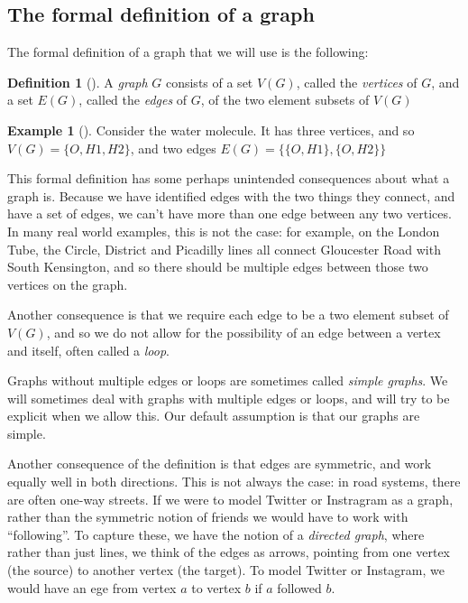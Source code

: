 \documentclass[10pt,]{book}
\theoremstyle{plain}
\theoremstyle{definition}
\newtheorem{definition}[theorem]{Definition}
\theoremstyle{definition}
\newtheorem{example}[theorem]{Example}
\theoremstyle{definition}
\begin{document}
\subsection[{The formal definition of a graph}]{The formal definition of a graph}\label{subsection-2}
\hypertarget{p-6}{}%
The formal definition of a graph that we will use is the following:%
\begin{definition}[{}]\label{definition-1}
\hypertarget{p-7}{}%
A \emph{graph} \(G\) consists of a set \(V(G)\), called the \emph{vertices} of \(G\), and a set \(E(G)\), called the \emph{edges} of \(G\), of the two element subsets of \(V(G)\)%
\end{definition}
\begin{example}[]\label{example-1}
\hypertarget{p-8}{}%
Consider the water molecule.  It has three vertices, and so \(V(G)=\{O, H1, H2\}\), and two edges \(E(G)=\big\{\{O, H1\},\{O,H2\}\big\}\)%
\end{example}
\hypertarget{p-9}{}%
This formal definition has some perhaps unintended consequences about what a graph is.  Because we have identified edges with the two things they connect, and have a set of edges, we can't have more than one edge between any two vertices.  In many real world examples, this is not the case: for example, on the London Tube, the Circle, District and Picadilly lines all connect Gloucester Road with South Kensington, and so there should be multiple edges between those two vertices on the graph.%
\par
\hypertarget{p-10}{}%
Another consequence is that we require each edge to be a two element subset of \(V(G)\), and so we do not allow for the possibility of an edge between a vertex and itself, often called a \emph{loop}.%
\par
\hypertarget{p-11}{}%
Graphs without multiple edges or loops are sometimes called \emph{simple graphs}.  We will sometimes deal with graphs with multiple edges or loops, and will try to be explicit when we allow this.  Our default assumption is that our graphs are simple.%
\par
\hypertarget{p-12}{}%
Another consequence of the definition is that edges are symmetric, and work equally well in both directions.  This is not always the case: in road systems, there are often one-way streets.  If we were to model Twitter or Instragram as a graph, rather than the symmetric notion of friends we would have to work with ``following''.  To capture these, we have the notion of a \emph{directed graph}, where rather than just lines, we think of the edges as arrows, pointing from one vertex (the source) to another vertex (the target).  To model Twitter or Instagram, we would have an ege from vertex \(a\) to vertex \(b\) if \(a\) followed \(b\).%
\typeout{************************************************}
\typeout{************************************************}
\end{document}
